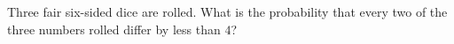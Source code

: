 Three fair six-sided dice are rolled. What is the probability that every two of the three numbers rolled differ by less than $4$?
